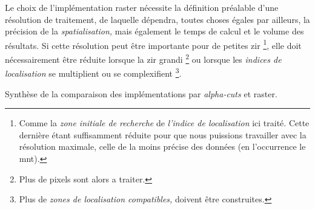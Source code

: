 Le choix de l'implémentation raster nécessite la définition préalable
d'une résolution de traitement, de laquelle dépendra, toutes choses
égales par ailleurs, la précision de la \emph{spatialisation,} mais
également le temps de calcul et le volume des résultats. Si cette
résolution peut être importante pour de petites zir
\footnote{Comme la \emph{zone initiale de recherche} de \emph{l'indice
    de localisation} ici traité. Cette dernière étant suffisamment
  réduite pour que nous puissions travailler avec la résolution
  maximale, celle de la moins précise des données (en l’occurrence le
  \ac{mnt}).}, elle doit nécessairement être réduite lorsque la
zir grandi \footnote{Plus de pixels sont alors a traiter.} ou
lorsque les \emph{indices de localisation} se multiplient ou se
complexifient \footnote{Plus de \emph{zones de localisation
    compatibles,} doivent être construites.}.

\begin{landscape}
  \begin{table}[H]
    \centering
    
    \caption{Synthèse de la comparaison des implémentations par
      \emph{alpha-cuts} et raster.}
    \label{tab:comp_implems}
  \end{table}
\end{landscape}

